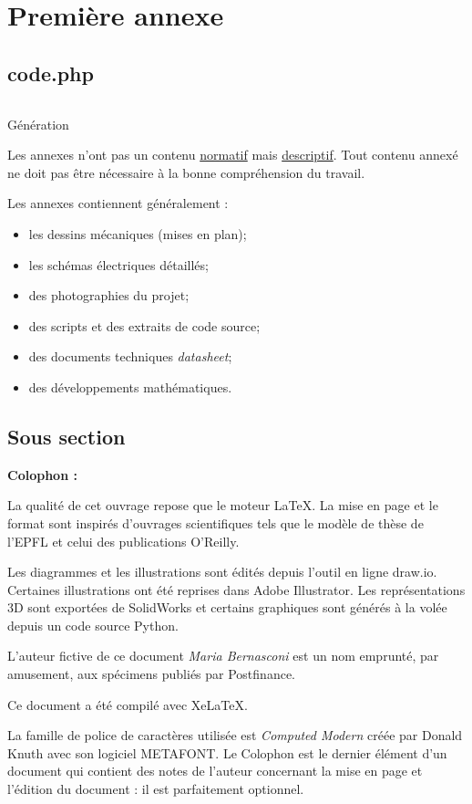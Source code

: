 \documentclass[
    iai, %
    eai, %
]{heig-tb}
\begin{document}
\appendix
\appendixpage
\addappheadtotoc

\chapter{Première annexe}
\section{code.php}

\begin{listing}[h]
  \inputminted[breaklines]{php}{assets/figures/php.php}
  \caption{Génération}
\end{listing}

Les annexes n'ont pas un contenu \underline{normatif} mais \underline{descriptif}. Tout contenu annexé ne doit pas être nécessaire à la bonne compréhension du travail.

Les annexes contiennent généralement :

\begin{itemize}
  \item les dessins mécaniques (mises en plan);
  \item les schémas électriques détaillés;
  \item des photographies du projet;
  \item des scripts et des extraits de code source;
  \item des documents techniques \pex \emph{datasheet};
  \item des développements mathématiques.
\end{itemize}
\section{Sous section}
\lipsum[1]

\let\cleardoublepage\clearpage
\backmatter

\label{glossaire}
\printnoidxglossary
\printbibliography
\label{index}
\printindex

\clearpage
\Large\textbf{Colophon :}\par\normalsize
\thispagestyle{empty}
La qualité de cet ouvrage repose que le moteur \LaTeX. La mise en page et le format sont inspirés d'ouvrages scientifiques tels que le modèle de thèse de l'EPFL et celui des publications O'Reilly.

Les diagrammes et les illustrations sont édités depuis l'outil en ligne draw.io. Certaines illustrations ont été reprises dans Adobe Illustrator. Les représentations 3D sont exportées de SolidWorks et certains graphiques sont générés à la volée depuis un code source Python.

L'auteur fictive de ce document \emph{Maria Bernasconi} est un nom emprunté, par amusement, aux spécimens publiés par Postfinance.

Ce document a été compilé avec XeLaTeX.

La famille de police de caractères utilisée est \emph{Computed Modern} créée par Donald Knuth avec son logiciel METAFONT.
\vfil
Le Colophon est le dernier élément d'un document qui contient des notes de l'auteur concernant la mise en page et l'édition du document : il est parfaitement optionnel.
\end{document}
